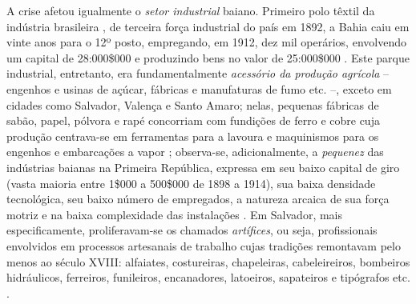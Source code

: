 A crise afetou igualmente o \textit{setor industrial} baiano. Primeiro polo têxtil da indústria brasileira \cite{stein_textil_1979}, de terceira força industrial do país em 1892, a Bahia caiu em vinte anos para o 12º posto, empregando, em 1912, dez mil operários, envolvendo um capital de 28:000\$000 e produzindo bens no valor de 25:000\$000 \cite[p.~29-30]{CPE1980}. Este parque industrial, entretanto, era fundamentalmente \textit{acessório da produção agrícola} -- engenhos e usinas de açúcar, fábricas e manufaturas de fumo etc. --, exceto em cidades como Salvador, Valença e Santo Amaro; nelas, pequenas fábricas de sabão, papel, pólvora e rapé concorriam com fundições de ferro e cobre cuja produção centrava-se em ferramentas para a lavoura e maquinismos para os engenhos e embarcações a vapor \cite[p.~30]{CPE1980}; observa-se, adicionalmente, a \textit{pequenez} das indústrias baianas na Primeira República, expressa em seu baixo capital de giro (vasta maioria entre 1\$000 a 500\$000 de 1898 a 1914), sua baixa densidade tecnológica, seu baixo número de empregados, a natureza arcaica de sua força motriz e na baixa complexidade das instalações \cite[p.~55]{CPE1980}. Em Salvador, mais especificamente, proliferavam-se os chamados \textit{artífices}, ou seja, profissionais envolvidos em processos artesanais de trabalho cujas tradições remontavam pelo menos ao século XVIII: alfaiates, costureiras, chapeleiras, cabeleireiros, bombeiros hidráulicos, ferreiros, funileiros, encanadores, latoeiros, sapateiros e tipógrafos etc. \cite{REIS2012}.


